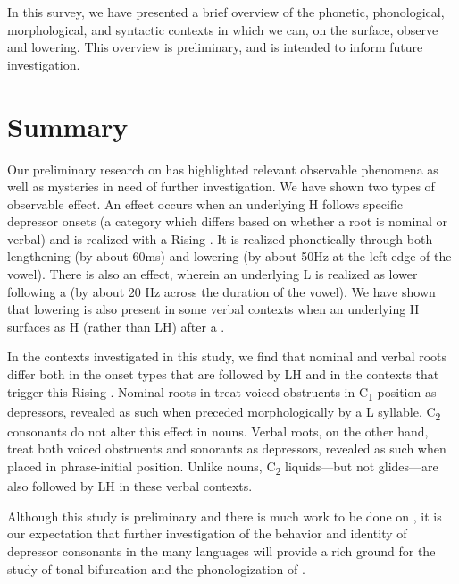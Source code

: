 \documentclass[output=paper,newtxmath,modfonts,nonflat]{langsci/langscibook}
\begin{document}
In this survey, we have presented a brief overview of the phonetic, phonological, morphological, and syntactic contexts in which we can, on the surface, observe   and  lowering. This overview is preliminary, and is intended to inform future investigation.

\section{Summary}\label{sec:lotven:5}

Our preliminary research on  has highlighted relevant observable phenomena as well as mysteries in need of further investigation. We have shown two types of observable effect. An  effect occurs when an underlying H follows specific depressor onsets (a category which differs based on whether a root is nominal or verbal) and is realized with a Rising . It is realized phonetically through both lengthening (by about 60ms) and  lowering (by about 50Hz at the left edge of the vowel). There is also an   effect, wherein an underlying L is realized as lower following a  (by about 20 Hz across the duration of the vowel). We have shown that   lowering is also present in some verbal contexts when an underlying H surfaces as H (rather than LH) after a . 

In the contexts investigated in this study, we find that nominal and verbal roots differ both in the onset types that are followed by LH and in the contexts that trigger this Rising . Nominal roots in  treat voiced obstruents in C\textsubscript{1} position as depressors, revealed as such when preceded morphologically by a L  syllable. C\textsubscript{2} consonants do not alter this effect in nouns. Verbal roots, on the other hand, treat both voiced obstruents and sonorants as depressors, revealed as such when placed in phrase-initial position. Unlike nouns, C\textsubscript{2} liquids—but not glides—are also followed by LH in these verbal contexts. 

Although this study is preliminary and there is much work to be done on , it is our expectation that further investigation of the behavior and identity of depressor consonants in the many  languages will provide a rich ground for the study of tonal bifurcation and the phonologization of .
\end{document}
